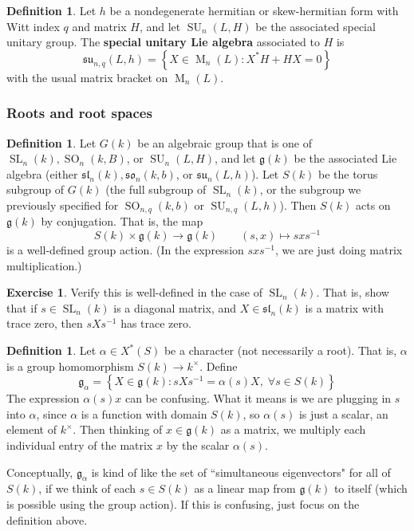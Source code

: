 \documentclass[12pt]{article}
\theoremstyle{definition}
\newtheorem{definition}[theorem]{Definition}
\newtheorem{exercise}[theorem]{Exercise}
\numberwithin{theorem}{subsection}
\newcommand{\lb}{\left\{}
\newcommand{\rb}{\right\}}
\newcommand{\tbf}{\textbf}
\newcommand{\inv}{^{-1}}
\newcommand{\frakg}{\mathfrak{g}}
\newcommand{\fraksl}{\mathfrak{sl}}
\DeclareMathOperator{\M}{M}
\DeclareMathOperator{\SL}{SL}
\DeclareMathOperator{\SU}{SU}
\DeclareMathOperator{\SO}{SO}
\begin{document}
\begin{definition}
Let $h$ be a nondegenerate hermitian or skew-hermitian form with Witt index $q$ and matrix $H$, and let $\SU_{n}(L,H)$ be the associated special unitary group. The \tbf{special unitary Lie algebra} associated to $H$ is
\[
	\mathfrak{su}_{n,q}(L,h) = \lb X \in \M_n(L) : X^* H + HX = 0 \rb
\]
with the usual matrix bracket on $\M_n(L)$.
\end{definition}

\subsubsection{Roots and root spaces}

\begin{definition}
Let $G(k)$ be an algebraic group that is one of $\SL_n(k), \SO_{n}(k,B)$, or $\SU_{n}(L,H)$, and let $\frakg(k)$ be the associated Lie algebra (either $\mathfrak{sl}_n(k), \mathfrak{so}_{n}(k,b)$, or $\mathfrak{su}_{n}(L,h)$). Let $S(k)$ be the torus subgroup of $G(k)$ (the full subgroup of $\SL_n(k)$, or the subgroup we previously specified for $\SO_{n,q}(k,b)$ or $\SU_{n,q}(L,h)$). Then $S(k)$ acts on $\frakg(k)$ by conjugation. That is, the map
\[
	S(k) \times \frakg(k) \to \frakg(k) \qquad (s,x) \mapsto sxs \inv
\]
is a well-defined group action. (In the expression $sxs \inv$, we are just doing matrix multiplication.)
\end{definition}

\begin{exercise}
Verify this is well-defined in the case of $\SL_n(k)$. That is, show that if $s \in \SL_n(k)$ is a diagonal matrix, and $X \in \fraksl_n(k)$ is a matrix with trace zero, then $sXs \inv$ has trace zero.
\end{exercise}

\begin{definition}
Let $\alpha \in X^*(S)$ be a character (not necessarily a root). That is, $\alpha$ is a group homomorphism $S(k) \to k^\times$. Define
\[
	\frakg_\alpha = \lb X \in \frakg(k) : sXs \inv = \alpha(s) X, \; \forall s \in S(k) \rb
\]
The expression $\alpha(s) x$ can be confusing. What it means is we are plugging in $s$ into $\alpha$, since $\alpha$ is a function with domain $S(k)$, so $\alpha(s)$ is just a scalar, an element of $k^\times$. Then thinking of $x \in \frakg(k)$ as a matrix, we multiply each individual entry of the matrix $x$ by the scalar $\alpha(s)$.

Conceptually, $\frakg_\alpha$ is kind of like the set of ``simultaneous eigenvectors" for all of $S(k)$, if we think of each $s \in S(k)$ as a linear map from $\frakg(k)$ to itself (which is possible using the group action). If this is confusing, just focus on the definition above.
\end{definition}
\end{document}
